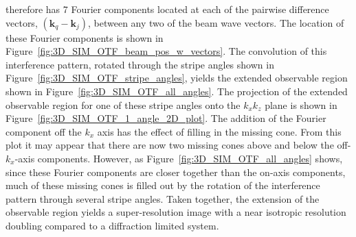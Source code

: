 therefore has 7 Fourier components located at each of the pairwise
difference vectors, $\left(\textbf{k}_{q}-\textbf{k}_{j}\right)$, 
between any two of the beam wave vectors. The location of these 
Fourier components is shown in 
Figure~\ref{fig:3D_SIM_OTF_beam_pos_w_vectors}. The convolution of 
this interference pattern, rotated through the stripe angles shown
in Figure~\ref{fig:3D_SIM_OTF_stripe_angles}, yields the extended
observable region shown in Figure~\ref{fig:3D_SIM_OTF_all_angles}.
The projection of the extended observable region for one of these 
stripe angles onto the $k_{x}k_{z}$ plane is shown in 
Figure~\ref{fig:3D_SIM_OTF_1_angle_2D_plot}. The addition of the
Fourier component off the $k_{x}$ axis has the effect of filling 
in the missing cone. From this plot it may appear that there are
now two missing cones above and below the off-$k_{x}$-axis components.
However, as Figure~\ref{fig:3D_SIM_OTF_all_angles} shows, 
since these Fourier components are closer together than the
on-axis components, much of these missing cones is filled out by 
the rotation of the interference pattern through several stripe
angles. Taken together, the extension of the observable region 
yields a super-resolution image with a near isotropic resolution 
doubling compared to a diffraction limited 
system\cite{gustafsson2008three}.

